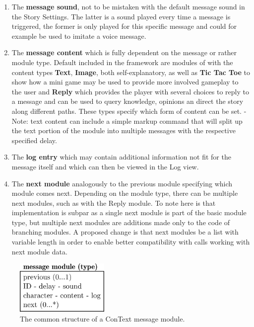 \begin{enumerate}
\item The \textbf{message sound}, not to be mistaken with the default message sound in the Story Settings. The latter is a sound played every time a message is triggered, the former is only played for this specific message and could for example be used to imitate a voice message.
\item The \textbf{message content} which is fully dependent on the message or rather module type. Default included in the framework are modules of with the content types \textbf{Text}, \textbf{Image}, both self-explanatory, as well as \textbf{Tic Tac Toe} to show how a mini game may be used to provide more involved gameplay to the user and \textbf{Reply} which provides the player with several choices to reply to a message and can be used to query knowledge, opinions an direct the story along different paths. These types specify which form of content can be set. - Note: text content can include a simple markup command that will split up the text portion of the module into multiple messages with the respective specified delay. 
\item The \textbf{log entry} which may contain additional information not fit for the message itself and which can then be viewed in the Log view.
\item The \textbf{next module} analogously to the previous module specifying which module comes next. Depending on the module type, there can be multiple next modules, such as with the Reply module. To note here is that implementation is subpar as a single next module is part of the basic module type, but multiple next modules are additions made only to the code of branching modules. A proposed change is that next modules be a list with variable length in order to enable better compatibility with calls working with next module data.
\end{enumerate}

\begin{figure}[h]
\centering
\includegraphics[width=0.4\textwidth]{figures/msgmod.png}
\caption[Message module structure]{The common structure of a ConText message module.}\label{fig:msgmod}
\end{figure}

